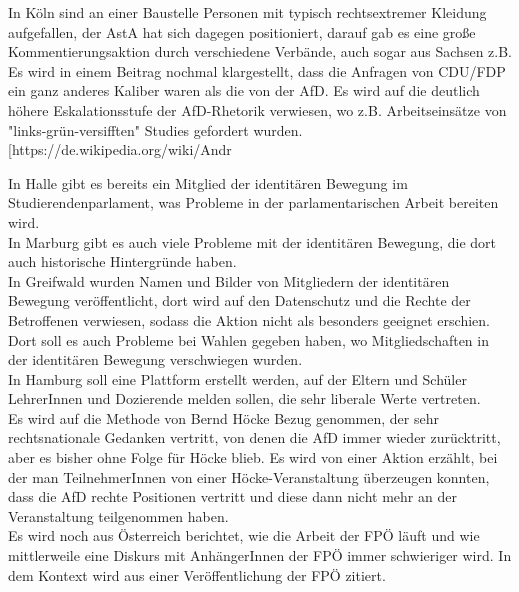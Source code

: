     In Köln sind an einer Baustelle Personen mit typisch rechtsextremer Kleidung aufgefallen, der AstA hat sich dagegen positioniert, darauf gab es eine große Kommentierungsaktion durch verschiedene Verbände, auch sogar aus Sachsen z.B. \\

    Es wird in einem Beitrag nochmal klargestellt, dass die Anfragen von CDU/FDP ein ganz anderes Kaliber waren als die von der AfD. Es wird auf die deutlich höhere Eskalationsstufe der AfD-Rhetorik verwiesen, wo z.B. Arbeitseinsätze von "links-grün-versifften" Studies gefordert wurden. [https://de.wikipedia.org/wiki/Andr%

    In Halle gibt es bereits ein Mitglied der identitären Bewegung im Studierendenparlament, was Probleme in der parlamentarischen Arbeit bereiten wird. \\

    In Marburg gibt es auch viele Probleme mit der identitären Bewegung, die dort auch historische Hintergründe haben. \\

    In Greifwald wurden Namen und Bilder von Mitgliedern der identitären Bewegung veröffentlicht, dort wird auf den Datenschutz und die Rechte der Betroffenen verwiesen, sodass die Aktion nicht als besonders geeignet erschien. Dort soll es auch Probleme bei Wahlen gegeben haben, wo Mitgliedschaften in der identitären Bewegung verschwiegen wurden. \\

    In Hamburg soll eine Plattform erstellt werden, auf der Eltern und Schüler LehrerInnen und Dozierende melden sollen, die sehr liberale Werte vertreten.  \\

    Es wird auf die Methode von Bernd Höcke Bezug genommen, der sehr rechtsnationale Gedanken vertritt, von denen die AfD immer wieder zurücktritt, aber es bisher ohne Folge für Höcke blieb. Es wird von einer Aktion erzählt, bei der man TeilnehmerInnen von einer Höcke-Veranstaltung überzeugen konnten, dass die AfD rechte Positionen vertritt und diese dann nicht mehr an der Veranstaltung teilgenommen haben. \\

    Es wird noch aus Österreich berichtet, wie die Arbeit der FPÖ läuft und wie mittlerweile eine Diskurs mit AnhängerInnen der FPÖ immer schwieriger wird. In dem Kontext wird aus einer Veröffentlichung der FPÖ zitiert. \\

